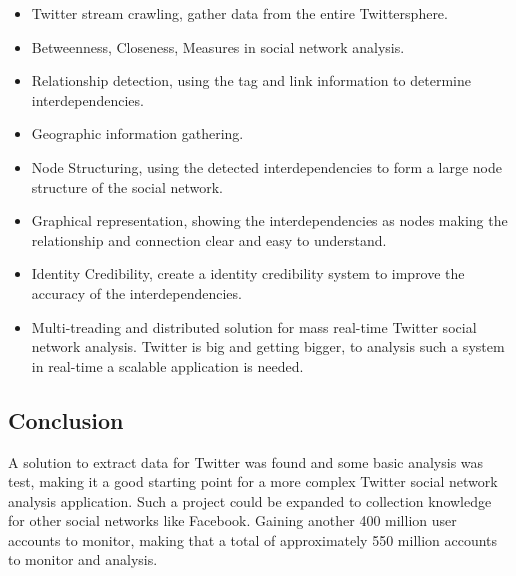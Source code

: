 \documentclass[]{article}  %
\begin{document}
\begin{itemize}
	\item Twitter stream crawling, gather data from the entire Twittersphere.
	\item Betweenness, Closeness, Measures in social network analysis.
	\item Relationship detection, using the tag and link information to determine interdependencies.
	\item Geographic information gathering.
	\item Node Structuring, using the detected interdependencies to form a large node structure of the social network.
	\item Graphical representation, showing the interdependencies as nodes making the relationship and connection clear and easy to understand.
	\item Identity Credibility, create a identity credibility system to improve the accuracy of the interdependencies.
	\item Multi-treading and distributed solution for mass real-time Twitter social network analysis. Twitter is big and getting bigger, to analysis such a system in real-time a scalable application is needed.
\end{itemize}

\subsection{Conclusion}

A solution to extract data for Twitter was found and some basic analysis was test, making it a good starting point for a more complex Twitter social network analysis application. Such a project could be expanded to collection knowledge for other social networks like Facebook. Gaining another 400 million user accounts to monitor, making that a total of approximately 550 million accounts to monitor and analysis.

\nocite{bib1} 
\nocite{bib2}
\nocite{bib3}
\nocite{bib4}
\nocite{bib5}
\nocite{bib6}
\nocite{bib7}
\nocite{bib8}
\nocite{bib9}
\nocite{bib10}
\nocite{bib11}
\nocite{bib12}
\nocite{bib13}




\end{document}
